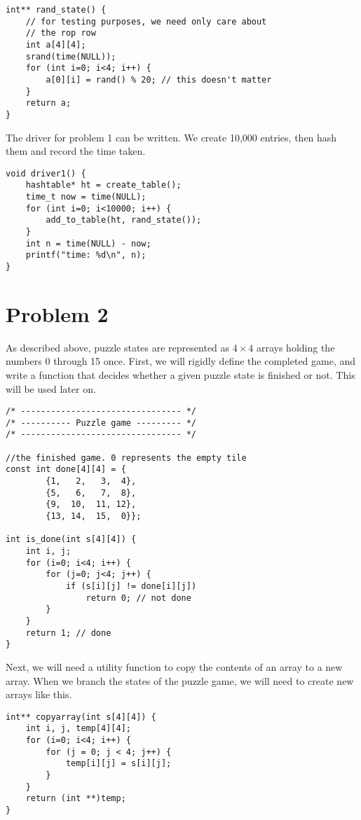 \documentclass[11pt]{article}
\begin{document}
\begin{verbatim}
int** rand_state() {
    // for testing purposes, we need only care about
    // the rop row
    int a[4][4];
    srand(time(NULL));
    for (int i=0; i<4; i++) {
        a[0][i] = rand() % 20; // this doesn't matter
    }
    return a;
}
\end{verbatim}

The driver for problem 1 can be written. We create 10,000 entries,
then hash them and record the time taken.

\begin{verbatim}
void driver1() {
    hashtable* ht = create_table();
    time_t now = time(NULL);
    for (int i=0; i<10000; i++) {
        add_to_table(ht, rand_state());
    }
    int n = time(NULL) - now;
    printf("time: %d\n", n);
}
\end{verbatim}



\section{Problem 2}
\label{sec-2}

As described above, puzzle states are represented as $4\times 4$
arrays holding the numbers 0 through 15 once. First, we will rigidly
define the completed game, and write a function that decides whether a
given puzzle state is finished or not. This will be used later on.

\begin{verbatim}
/* -------------------------------- */
/* ---------- Puzzle game --------- */
/* -------------------------------- */

//the finished game. 0 represents the empty tile
const int done[4][4] = {
        {1,   2,   3,  4},
        {5,   6,   7,  8},
        {9,  10,  11, 12},
        {13, 14,  15,  0}};

int is_done(int s[4][4]) {
    int i, j;
    for (i=0; i<4; i++) {
        for (j=0; j<4; j++) {
            if (s[i][j] != done[i][j])
                return 0; // not done
        }
    }
    return 1; // done
}
\end{verbatim}

Next, we will need a utility function to copy the contents of an array
to a new array. When we branch the states of the puzzle game, we will
need to create new arrays like this.

\begin{verbatim}
int** copyarray(int s[4][4]) {
    int i, j, temp[4][4];
    for (i=0; i<4; i++) {
        for (j = 0; j < 4; j++) {
            temp[i][j] = s[i][j];
        }
    }
    return (int **)temp;
}
\end{verbatim}
\end{document}
